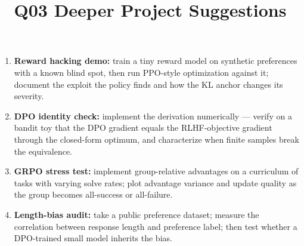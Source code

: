 \documentclass[11pt]{article}
\title{Q03 Deeper Project Suggestions}
\date{}
\begin{document}
\maketitle
\begin{enumerate}[noitemsep]
\item \textbf{Reward hacking demo:} train a tiny reward model on synthetic preferences with a known blind spot, then run PPO-style optimization against it; document the exploit the policy finds and how the KL anchor changes its severity.
\item \textbf{DPO identity check:} implement the derivation numerically --- verify on a bandit toy that the DPO gradient equals the RLHF-objective gradient through the closed-form optimum, and characterize when finite samples break the equivalence.
\item \textbf{GRPO stress test:} implement group-relative advantages on a curriculum of tasks with varying solve rates; plot advantage variance and update quality as the group becomes all-success or all-failure.
\item \textbf{Length-bias audit:} take a public preference dataset; measure the correlation between response length and preference label; then test whether a DPO-trained small model inherits the bias.
\end{enumerate}
\end{document}
